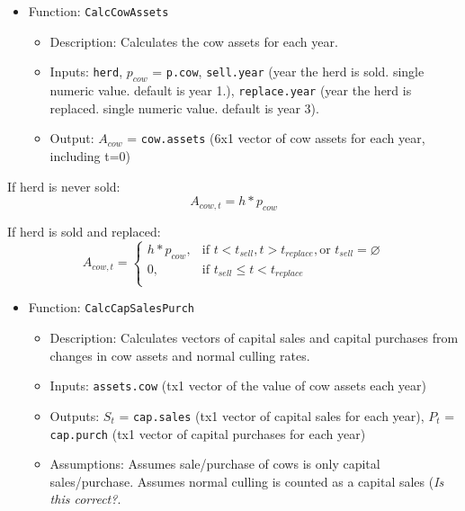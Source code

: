 \documentclass[11pt]{article}
\begin{document}
\begin{itemize}
\item Function: \verb!CalcCowAssets!
	\begin{itemize}
	\item Description: Calculates the cow assets for each year.
	\item Inputs: \verb!herd!, $p_{cow}$ = \verb!p.cow!, \verb!sell.year! (year the herd is sold. single numeric value. default is year 1.), \verb!replace.year! (year the herd is replaced. single numeric value. default is year 3).
	\item Output: $A_{cow}$ = \verb!cow.assets! (6x1 vector of cow assets for each year, including t=0)
	\end{itemize}
\end{itemize}

If herd is never sold:
\begin{equation}
A_{cow,t} = h * p_{cow}
\end{equation}

If herd is sold and replaced:
\begin{equation}
A_{cow,t} =  
\begin{cases}
h * p_{cow}, & \text{if  } t < t_{sell},  t > t_{replace}, \text{or } t_{sell} = \varnothing \\
0, & \text{if  } t_{sell} \le t < t_{replace} \\
\end{cases}
\end{equation}

\begin{itemize}
\item Function: \verb!CalcCapSalesPurch!
	\begin{itemize}
	\item Description: Calculates vectors of capital sales and capital purchases from changes in cow assets and normal culling rates. 
  	\item Inputs: \verb!assets.cow! (tx1 vector of the value of cow assets each year)
  	\item Outputs: $S_t$ = \verb!cap.sales! (tx1 vector of capital sales for each year), $P_t$ = \verb!cap.purch! (tx1 vector of capital purchases for each year)
  	\item Assumptions: Assumes sale/purchase of cows is only capital sales/purchase. Assumes normal culling is counted as a capital sales (\textit{Is this correct?}.
	\end{itemize}
\end{itemize}
\end{document}
